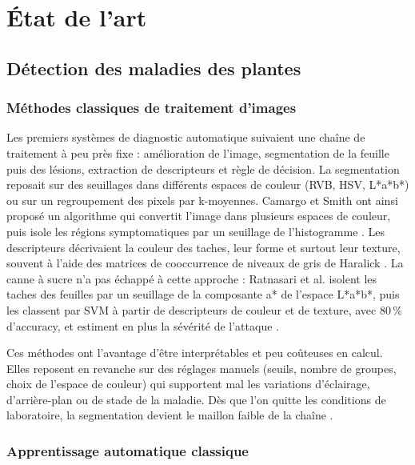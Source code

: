\section{État de l'art}
\label{sec:etat-art}

\subsection{Détection des maladies des plantes}

\subsubsection{Méthodes classiques de traitement d'images}

Les premiers systèmes de diagnostic automatique suivaient une chaîne de traitement à peu près fixe : amélioration de l'image, segmentation de la feuille puis des lésions, extraction de descripteurs et règle de décision. La segmentation reposait sur des seuillages dans différents espaces de couleur (RVB, HSV, L*a*b*) ou sur un regroupement des pixels par k-moyennes. Camargo et Smith ont ainsi proposé un algorithme qui convertit l'image dans plusieurs espaces de couleur, puis isole les régions symptomatiques par un seuillage de l'histogramme \cite{camargo2009image}. Les descripteurs décrivaient la couleur des taches, leur forme et surtout leur texture, souvent à l'aide des matrices de cooccurrence de niveaux de gris de Haralick \cite{haralick1973textural}. La canne à sucre n'a pas échappé à cette approche : Ratnasari et al. isolent les taches des feuilles par un seuillage de la composante a* de l'espace L*a*b*, puis les classent par SVM à partir de descripteurs de couleur et de texture, avec 80\,\% d'accuracy, et estiment en plus la sévérité de l'attaque \cite{ratnasari2014sugarcane}.

Ces méthodes ont l'avantage d'être interprétables et peu coûteuses en calcul. Elles reposent en revanche sur des réglages manuels (seuils, nombre de groupes, choix de l'espace de couleur) qui supportent mal les variations d'éclairage, d'arrière-plan ou de stade de la maladie. Dès que l'on quitte les conditions de laboratoire, la segmentation devient le maillon faible de la chaîne \cite{barbedo2016review}.

\subsubsection{Apprentissage automatique classique}


